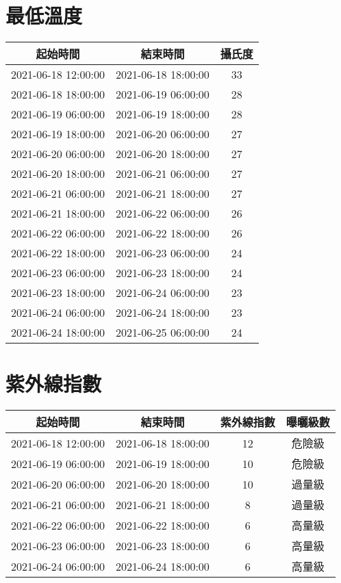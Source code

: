 \documentclass{article}%
\begin{document}
\begin{center}
\section{最低溫度}%
\label{sec:}%
\begin{tabular}{|c|c|c|}%
\hline%
起始時間&結束時間&攝氏度\\%
\hline%
2021{-}06{-}18 12:00:00&2021{-}06{-}18 18:00:00&33\\%
\hline%
2021{-}06{-}18 18:00:00&2021{-}06{-}19 06:00:00&28\\%
\hline%
2021{-}06{-}19 06:00:00&2021{-}06{-}19 18:00:00&28\\%
\hline%
2021{-}06{-}19 18:00:00&2021{-}06{-}20 06:00:00&27\\%
\hline%
2021{-}06{-}20 06:00:00&2021{-}06{-}20 18:00:00&27\\%
\hline%
2021{-}06{-}20 18:00:00&2021{-}06{-}21 06:00:00&27\\%
\hline%
2021{-}06{-}21 06:00:00&2021{-}06{-}21 18:00:00&27\\%
\hline%
2021{-}06{-}21 18:00:00&2021{-}06{-}22 06:00:00&26\\%
\hline%
2021{-}06{-}22 06:00:00&2021{-}06{-}22 18:00:00&26\\%
\hline%
2021{-}06{-}22 18:00:00&2021{-}06{-}23 06:00:00&24\\%
\hline%
2021{-}06{-}23 06:00:00&2021{-}06{-}23 18:00:00&24\\%
\hline%
2021{-}06{-}23 18:00:00&2021{-}06{-}24 06:00:00&23\\%
\hline%
2021{-}06{-}24 06:00:00&2021{-}06{-}24 18:00:00&23\\%
\hline%
2021{-}06{-}24 18:00:00&2021{-}06{-}25 06:00:00&24\\%
\hline%
\end{tabular}

%
\section{紫外線指數}%
\label{sec:}%
\begin{tabular}{|c|c|c|c|}%
\hline%
起始時間&結束時間&紫外線指數&曝曬級數\\%
\hline%
2021{-}06{-}18 12:00:00&2021{-}06{-}18 18:00:00&12&危險級\\%
\hline%
2021{-}06{-}19 06:00:00&2021{-}06{-}19 18:00:00&10&危險級\\%
\hline%
2021{-}06{-}20 06:00:00&2021{-}06{-}20 18:00:00&10&過量級\\%
\hline%
2021{-}06{-}21 06:00:00&2021{-}06{-}21 18:00:00&8&過量級\\%
\hline%
2021{-}06{-}22 06:00:00&2021{-}06{-}22 18:00:00&6&高量級\\%
\hline%
2021{-}06{-}23 06:00:00&2021{-}06{-}23 18:00:00&6&高量級\\%
\hline%
2021{-}06{-}24 06:00:00&2021{-}06{-}24 18:00:00&6&高量級\\%
\hline%
\end{tabular}


\end{center}
\end{document}
